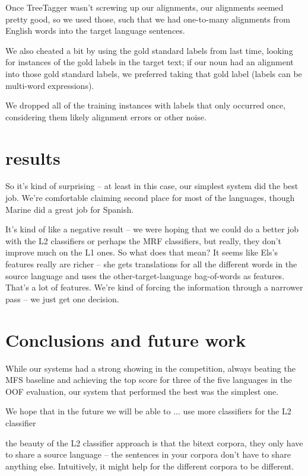 \documentclass[11pt,letterpaper]{article}
\begin{document}
Once TreeTagger wasn't screwing up our alignments, our alignments seemed pretty
good, so we used those, such that we had one-to-many alignments from English
words into the target language sentences.


We also cheated a bit by using the gold standard labels from last time, looking
for instances of the gold labels in the target text; if our noun had an
alignment into those gold standard labels, we preferred taking that gold label
(labels can be multi-word expressions).


We dropped all of the training instances with labels that only occurred once,
considering them likely alignment errors or other noise.


\section{results}
So it's kind of surprising -- at least in this case, our simplest system did
the best job. We're comfortable claiming second place for most of the
languages, though Marine did a great job for Spanish.


It's kind of like a negative result -- we were hoping that we could do a better
job with the L2 classifiers or perhaps the MRF classifiers, but really, they
don't improve much on the L1 ones.
So what does that mean?
It seems like Els's features really are richer -- she gets translations for all
the different words in the source language and uses the other-target-language
bag-of-words as features. That's a lot of features. We're kind of forcing the
information through a narrower pass -- we just get one decision.


\section{Conclusions and future work}


While our systems had a strong showing in the competition, always beating the
MFS baseline and achieving the top score for three of the five languages in the
OOF evaluation, our system that performed the best was the simplest one.


We hope that in the future we will be able to ...
 use more classifiers for the L2 classifier

 the beauty of the L2 classifier approach is that the bitext corpora, they
only have to share a source language -- the sentences in your corpora don't
have to share anything else. Intuitively, it might help for the different
corpora to be different.
\end{document}

